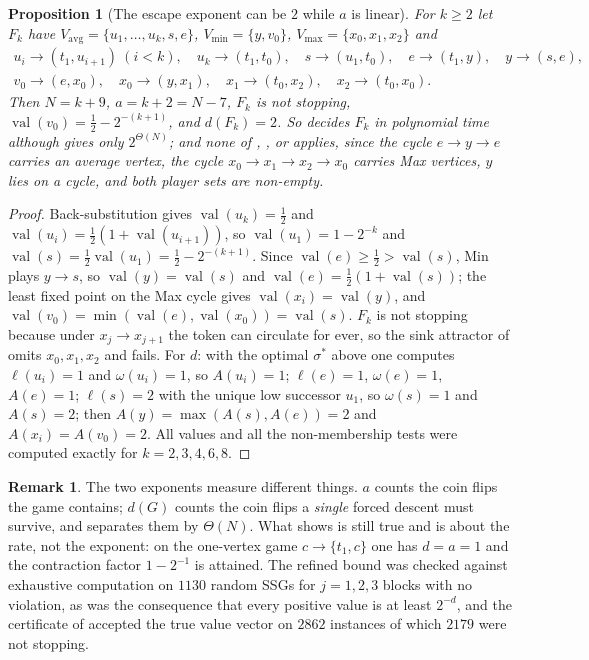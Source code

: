 \documentclass[11pt]{article}
\theoremstyle{plain}
\newtheorem{proposition}[theorem]{Proposition}
\theoremstyle{definition}
\newtheorem{remark}[theorem]{Remark}
\DeclareMathOperator{\val}{val}
\newcommand{\Vmax}{V_{\max}}
\newcommand{\Vmin}{V_{\min}}
\newcommand{\Vavg}{V_{\mathrm{avg}}}
\begin{document}
\begin{proposition}[The escape exponent can be $2$ while $a$ is
linear]\label{prop:fk-family}
For $k\ge2$ let $F_k$ have $\Vavg=\{u_1,\dots,u_k,s,e\}$,
$\Vmin=\{y,v_0\}$, $\Vmax=\{x_0,x_1,x_2\}$ and
\[
\begin{gathered}
  u_i\to(t_1,u_{i+1})\ (i<k),\quad u_k\to(t_1,t_0),\quad s\to(u_1,t_0),\quad
  e\to(t_1,y),\quad y\to(s,e),\\
  v_0\to(e,x_0),\quad x_0\to(y,x_1),\quad x_1\to(t_0,x_2),\quad x_2\to(t_0,x_0).
\end{gathered}
\]
Then $N=k+9$, $a=k+2=N-7$, $F_k$ is \emph{not} stopping,
$\val(v_0)=\tfrac12-2^{-(k+1)}$, and $d(F_k)=2$. So
 decides $F_k$ in polynomial time although
 gives only $2^{\Theta(N)}$; and none of
, ,  or
 applies, since the cycle $e\to y\to e$ carries an
average vertex, the cycle $x_0\to x_1\to x_2\to x_0$ carries Max
vertices, $y$ lies on a cycle, and both player sets are non-empty.
\end{proposition}

\begin{proof}
Back-substitution gives $\val(u_k)=\tfrac12$ and
$\val(u_i)=\tfrac12(1+\val(u_{i+1}))$, so $\val(u_1)=1-2^{-k}$ and
$\val(s)=\tfrac12\val(u_1)=\tfrac12-2^{-(k+1)}$. Since $\val(e)\ge\tfrac12>\val(s)$,
Min plays $y\to s$, so $\val(y)=\val(s)$ and
$\val(e)=\tfrac12(1+\val(s))$; the least fixed point on the Max cycle gives
$\val(x_i)=\val(y)$, and $\val(v_0)=\min(\val(e),\val(x_0))=\val(s)$.
$F_k$ is not stopping because under $x_j\to x_{j+1}$ the token can
circulate for ever, so the sink attractor of  omits
$x_0,x_1,x_2$ and  fails. For $d$: with the optimal
$\sigma^\ast$ above one computes $\ell(u_i)=1$ and $\omega(u_i)=1$, so
$A(u_i)=1$; $\ell(e)=1$, $\omega(e)=1$, $A(e)=1$; $\ell(s)=2$ with the
unique low successor $u_1$, so $\omega(s)=1$ and $A(s)=2$; then
$A(y)=\max(A(s),A(e))=2$ and $A(x_i)=A(v_0)=2$. All values and all the
non-membership tests were computed exactly for
$k=2,3,4,6,8$.
\end{proof}

\begin{remark}\label{rem:escape}
The two exponents measure different things. $a$ counts the coin flips the
game contains; $d(G)$ counts the coin flips a \emph{single} forced descent
must survive, and  separates them by
$\Theta(N)$. What  shows is still true and is
about the rate, not the exponent: on the one-vertex game
$c\to\{t_1,c\}$ one has $d=a=1$ and the contraction factor
$1-2^{-1}$ is attained. The refined bound was checked against exhaustive
computation on $1130$ random SSGs for $j=1,2,3$ blocks with no violation,
as was the consequence that every positive value is at least $2^{-d}$,
and the certificate of  accepted the true value
vector on $2862$ instances of which $2179$ were not stopping.
\end{remark}
\end{document}
